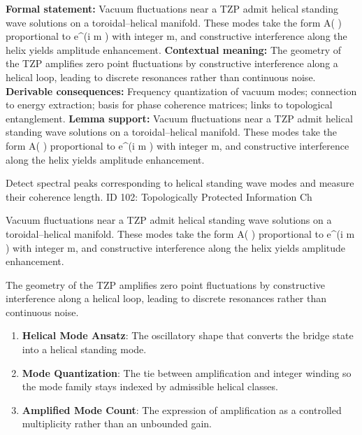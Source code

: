 \begingroup\footnotesize\setlength{\emergencystretch}{3em}\sloppy
\textbf{Formal statement:} Vacuum fluctuations near a TZP admit helical standing wave solutions on a toroidal--helical manifold. These modes take the form A( ) proportional to e\textasciicircum{}(i m  ) with integer m, and constructive interference along the helix yields amplitude enhancement.
\textbf{Contextual meaning:} The geometry of the TZP amplifies zero point fluctuations by constructive interference along a helical loop, leading to discrete resonances rather than continuous noise.
\textbf{Derivable consequences:} Frequency quantization of vacuum modes; connection to energy extraction; basis for phase coherence matrices; links to topological entanglement.
\textbf{Lemma support:} Vacuum fluctuations near a TZP admit helical standing wave solutions on a toroidal--helical manifold. These modes take the form A( ) proportional to e\textasciicircum{}(i m  ) with integer m, and constructive interference along the helix yields amplitude enhancement.\par
\endgroup

Detect spectral peaks corresponding to helical standing wave modes and measure their coherence length. ID 102: Topologically Protected Information Ch

Vacuum fluctuations near a TZP admit helical standing wave solutions on a toroidal--helical manifold. These modes take the form A( ) proportional to e\textasciicircum{}(i m  ) with integer m, and constructive interference along the helix yields amplitude enhancement.

The geometry of the TZP amplifies zero point fluctuations by constructive interference along a helical loop, leading to discrete resonances rather than continuous noise.
\endgroup

\begin{enumerate}[leftmargin=1.6em,itemsep=6pt,topsep=4pt]
\item \textbf{Helical Mode Ansatz}: The oscillatory shape that converts the bridge state into a helical standing mode.
\item \textbf{Mode Quantization}: The tie between amplification and integer winding so the mode family stays indexed by admissible helical classes.
\item \textbf{Amplified Mode Count}: The expression of amplification as a controlled multiplicity rather than an unbounded gain.
\end{enumerate}

